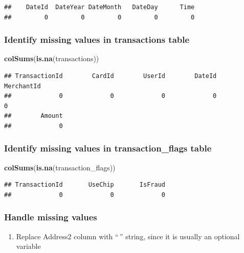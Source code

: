 \documentclass[
]{article}
\newenvironment{Shaded}{\begin{snugshade}}{\end{snugshade}}
\newcommand{\FunctionTok}[1]{\textcolor[rgb]{0.13,0.29,0.53}{\textbf{#1}}}
\newcommand{\NormalTok}[1]{#1}
\providecommand{\tightlist}{%
  \setlength{\itemsep}{0pt}\setlength{\parskip}{0pt}}
\begin{document}
\begin{verbatim}
##    DateId  DateYear DateMonth   DateDay      Time 
##         0         0         0         0         0
\end{verbatim}

\subsubsection{Identify missing values in transactions
table}\label{identify-missing-values-in-transactions-table}

\begin{Shaded}
\begin{Highlighting}[]
\FunctionTok{colSums}\NormalTok{(}\FunctionTok{is.na}\NormalTok{(transactions))}
\end{Highlighting}
\end{Shaded}

\begin{verbatim}
## TransactionId        CardId        UserId        DateId    MerchantId 
##             0             0             0             0             0 
##        Amount 
##             0
\end{verbatim}

\subsubsection{Identify missing values in transaction\_flags
table}\label{identify-missing-values-in-transaction_flags-table}

\begin{Shaded}
\begin{Highlighting}[]
\FunctionTok{colSums}\NormalTok{(}\FunctionTok{is.na}\NormalTok{(transaction\_flags))}
\end{Highlighting}
\end{Shaded}

\begin{verbatim}
## TransactionId       UseChip       IsFraud 
##             0             0             0
\end{verbatim}

\subsubsection{Handle missing values}\label{handle-missing-values}

\begin{enumerate}
\def\labelenumi{\arabic{enumi}.}
\tightlist
\item
  Replace Address2 column with ``\,'' string, since it is usually an
  optional variable
\end{enumerate}
\end{document}
